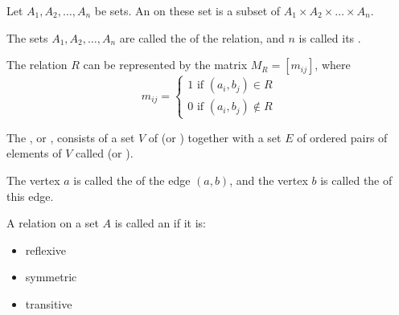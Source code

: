             \par Let $A_{1}, A_{2}, \ldots, A_{n}$ be sets. An  on these set
            is a subset of $A_{1} \times A_{2} \times \ldots \times A_{n}$.
            \par The sets $A_{1}, A_{2}, \ldots, A_{n}$ are called the  of the
            relation, and $n$ is called its .

            \par The relation $R$ can be represented by the matrix $M_{R} = [m_{ij}]$, where
            \begin{equation}
                m_{ij} = 
                \begin{cases}
                    1 \mbox{ if } (a_{i}, b_{j}) \in R \\
                    0 \mbox{ if } (a_{i}, b_{j}) \not \in R
                \end{cases}
            \end{equation}

            \par The , or , consists of a set $V$ of
             (or ) together with a set $E$ of ordered pairs of
            elements of $V$ called  (or ).
            \par The vertex $a$ is called the  of the edge $(a, b)$, and
            the vertex $b$ is called the  of this edge.


        \par A relation on a set $A$ is called an  if it is:
        \begin{itemize}
            \item reflexive
            \item symmetric
            \item transitive
        \end{itemize}

